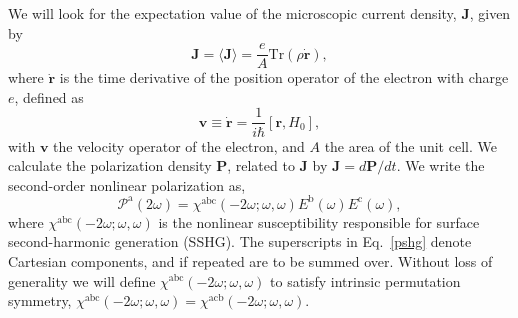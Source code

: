 We will look for the expectation value of the microscopic current density,
$\mathbf{J}$, given by
\begin{equation*}
\mathbf{J} = \langle{\mathbf{J}}\rangle 
           = \frac{e}{A}\mathrm{Tr}({\rho}\dot{\mathbf{r}}),
\end{equation*}
where $\dot{\mathbf{r}}$ is the time derivative of the position operator of the
electron with charge $e$, defined as
\begin{equation}
\mathbf{v}\equiv \dot{\mathbf{r}}=\frac{1}{i\hbar }[\mathbf{r},H_0],  
\label{mv}
\end{equation}
with $\mathbf{v}$ the velocity operator of the electron, and $A$ the area of the
unit cell. We calculate the polarization density $\mathbf{P}$, related to
$\mathbf{J}$ by $\mathbf{J}=d\mathbf{P}/dt$. We write the second-order nonlinear
polarization as,
\begin{equation}
\boldsymbol{\mathcal{P}}^{\mathrm{a}}(2\omega)=
\chi^{\mathrm{abc}}(-2\omega;\omega,\omega)
E^{\mathrm{b}}(\omega)E^{\mathrm{c}}(\omega),  
\label{pshg}
\end{equation}
where $\chi^{\mathrm{a}\mathrm{b}\mathrm{c}}(-2\omega ;\omega ,\omega )$ is the
nonlinear susceptibility responsible for surface second-harmonic generation
(SSHG). The superscripts in Eq.~\eqref{pshg} denote Cartesian components, and if
repeated are to be summed over. Without loss of generality we will define
$\chi^{\mathrm{a}\mathrm{b}\mathrm{c}}(-2\omega;\omega,\omega)$ to satisfy
intrinsic permutation symmetry,
$\chi^{\mathrm{a}\mathrm{b}\mathrm{c}}(-2\omega;\omega ,\omega )
=\chi^{\mathrm{a}\mathrm{c}\mathrm{b}}(-2\omega ;\omega,\omega )$.

